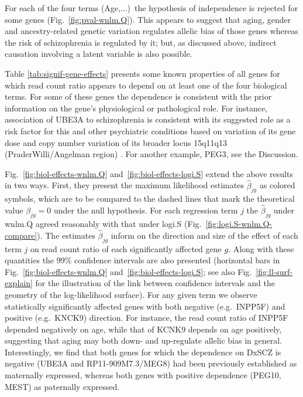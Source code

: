\documentclass[letterpaper]{article}
\begin{document}
For each of the four terms (Age,...)~the hypothesis of independence is
rejected for some genes (Fig.~\ref{fig:pval-wnlm.Q}). This appears to suggest
that aging, gender and ancestry-related genetic variation regulates allelic
bias of those genes whereas the risk of schizophrenia is regulated by it; but,
as discussed above, indirect causation involving a latent variable is also
possible.

Table \ref{tab:signif-gene-effects} presents some known properties of all
genes for which read count ratio appears to depend on at least one of the four
biological terms. For some of these genes the dependence is consistent with
the prior information on the gene's physiological or pathological role.  For
instance, association of UBE3A to schizophrenia is consistent with its
suggested role as a risk factor for this and other psychiatric conditions
based on variation of its gene dose and copy number variation of its broader
locus 15q11q13 (PraderWilli/Angelman region) \cite{Sullivan2012,
McNamara2013}.  For another example, PEG3, see the Discussion.

Fig.~\ref{fig:biol-effects-wnlm.Q} and~\ref{fig:biol-effects-logi.S} extend
the above results in two ways. First, they present the maximum likelihood
estimates \(\hat\beta_{jg}\) as colored symbols, which are to be compared to
the dashed lines that mark the theoretical value \(\beta_{jg} = 0\) under the
null hypothesis.  For each regression term \(j\) the \(\hat\beta_{jg}\) under
wnlm.Q agreed reasonably with that under logi.S
(Fig.~\ref{fig:logi.S-wnlm.Q-compare}).  The estimates \(\hat\beta_{jg}\)
inform on the direction and size of the effect of each term \(j\) on read
count ratio of each significantly affected gene \(g\).  Along with these
quantities the 99\% confidence intervals are also presented (horizontal bars
in Fig.~\ref{fig:biol-effects-wnlm.Q} and~\ref{fig:biol-effects-logi.S}; see
also Fig.~\ref{fig:ll-surf-explain} for the illustration of the link between
confidence intervals and the geometry of the log-likelihood surface). For any
given term we observe statistically significantly affected genes with both
negative (e.g.~INPP5F) and positive (e.g.~KNCK9) direction.  For instance, the
read count ratio of INPP5F depended negatively on age, while that of KCNK9
depends on age positively, suggesting that aging may both down- and
up-regulate allelic bias in general. Interestingly, we find that both genes
for which the dependence on DxSCZ is negative (UBE3A and RP11-909M7.3/MEG8)
had been previously established as maternally expressed, whereas both genes
with positive dependence (PEG10, MEST) as paternally expressed.
\end{document}
